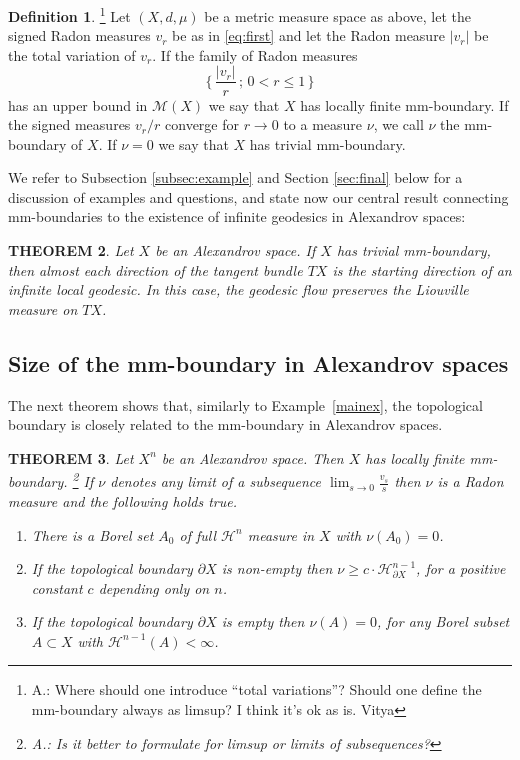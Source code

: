 \documentclass[12pt,leqno,intlimits]{amsart}
\numberwithin{equation}{section}
\newtheorem{thm}{THEOREM}[section]
\theoremstyle{definition}
\newtheorem{defn}[thm]{Definition}%
\theoremstyle{remark}
\newcommand{\exref}[1]{Example~\ref{#1}}
\begin{document}
\begin{defn}  \footnote{A.:  Where should one introduce ``total variations''?  Should one define the mm-boundary always as limsup?{\color{red} I think it's ok as is. Vitya}}
Let $(X,d,\mu)$ be a metric measure space as above,  let  the signed Radon measures $v_r$ be as in \eqref{eq:first} and let  the Radon measure $|v_r|$ be the total variation of $v_r$.
If the  family of Radon measures
\[\{\, \frac {| v_r |}  {r } \,;\,  0<r\leq  1 \,\}\]
has an upper bound in $\mathcal M( X)$ we say that $X$ has   locally finite mm-boundary.
If the signed measures $v_r  /r$  converge for $r\to 0$ to a measure $\nu$, we call $\nu$ the mm-boundary of $X$.  If $\nu =0$ we say that $X$ has trivial mm-boundary.
\end{defn}


We refer to Subsection \ref{subsec:example}  and Section \ref{sec:final}  below for a discussion of  examples and questions, and
 state now our central  result connecting  mm-boundaries to the existence  of infinite geodesics in Alexandrov spaces:

 \begin{thm} \label{thmmain}
 Let $X$ be an Alexandrov space. 
 If $X$ has trivial mm-boundary, then  almost each direction of the tangent
 bundle $TX$ is the starting direction of  an infinite local geodesic. 
 In this case, the geodesic flow preserves the Liouville measure on $TX$.
 \end{thm}

\subsection{Size of the mm-boundary in Alexandrov spaces}
The next theorem shows that, similarly to \exref{mainex},  the topological boundary is closely related to the mm-boundary in Alexandrov spaces.

\begin{thm} \label{alexandrovthm}
Let $X^n$ be an Alexandrov space. Then $X$ has locally finite mm-boundary.  \footnote{ A.:  Is it better to formulate for limsup or limits of subsequences?}
If $\nu$ denotes any limit of a subsequence $\lim _{s\to 0} \frac {v_s}  {s}$ then $\nu$ is a Radon measure and
 the following holds true.
\begin{enumerate}
\item\label{full-measure-zero-nu}There is a Borel set $A_0$ of full $\mathcal H^n$ measure in $X$
with $\nu (A_0)=0$.
\item\label{bry-nu} If the topological boundary $\partial X$ is non-empty then $\nu \geq c \cdot \mathcal H^{n-1} _{\partial X}$,
for a positive constant $c$ depending only on $n$.
\item \label{n-1-nu} If the topological boundary $\partial X$ is empty then $\nu (A)=0$, for any Borel subset $A\subset X$ with  $\mathcal H^{n-1} (A)<\infty$.
\end{enumerate}
\end{thm}
\end{document}
